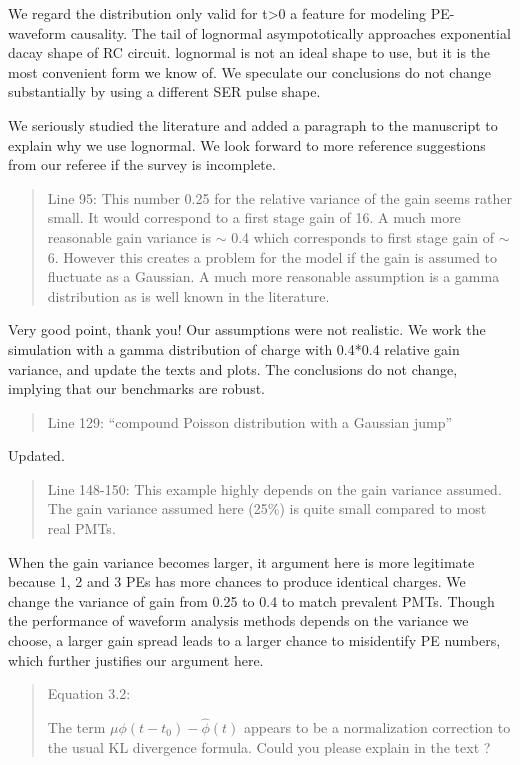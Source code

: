 \documentclass[12pt]{article}
\begin{document}
We regard the distribution only valid for t>0 a feature for modeling PE-waveform causality.  The tail of lognormal asympototically approaches exponential dacay shape of RC circuit. lognormal is not an ideal shape to use, but it is the most convenient form we know of.  We speculate our conclusions do not change substantially by using a different SER pulse shape.

We seriously studied the literature and added a paragraph to the manuscript to explain why we use lognormal.  We look forward to more reference suggestions from our referee if the survey is incomplete.

\begin{quote}
Line 95: This number 0.25 for the relative variance of the gain seems rather small. It would correspond to a first stage gain of 16. A much more reasonable gain variance is $\sim$ 0.4 which corresponds to first stage gain of $\sim$ 6. However this creates a problem for the model if the gain is assumed to fluctuate as a Gaussian. A much more reasonable assumption is a gamma distribution as is well known in the literature.
\end{quote}

Very good point, thank you!  Our assumptions were not realistic.  We work the simulation with a gamma distribution of charge with 0.4*0.4 relative gain variance, and update the texts and plots.  The conclusions do not change, implying that our benchmarks are robust. 

\begin{quote}
Line 129: ``compound Poisson distribution with a Gaussian jump''
\end{quote}

Updated.

\begin{quote}
Line 148-150: This example highly depends on the gain variance assumed. The gain variance assumed here (25\%) is quite small compared to most real PMTs.
\end{quote}

When the gain variance becomes larger, it argument here is more legitimate because 1, 2 and 3 PEs has more chances to produce identical charges. We change the variance of gain from 0.25 to 0.4 to match prevalent PMTs. Though the performance of waveform analysis methods depends on the variance we choose, a larger gain spread leads to a larger chance to misidentify PE numbers, which further justifies our argument here.

\begin{quote}
Equation 3.2:

The term $\mu\phi(t-t_0)-\hat{\phi}(t)$ appears to be a normalization correction to the usual KL divergence formula. Could you please explain in the text ?
\end{quote}
\end{document}

